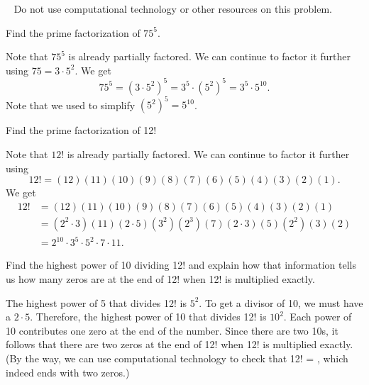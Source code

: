 \begin{exam}
\label{exam_prime_fact}
~
    Do not use computational technology or other resources on this problem.
        \begin{apart}
            \item Find the prime factorization of $75^5$.  
                \begin{soln}
                    Note that $75^5$ is already partially factored.  We can continue to factor it further using $75 = 3\cdot5^2$.  We get
                        $$75^5=(3\cdot5^2)^5
                        =3^5 \cdot \left(5^2\right)^5
                        = 3^5\cdot 5^{10}.$$
                    Note that we used  to simplify $\left(5^2\right)^5=5^{10}$.
                \end{soln}
            \item Find the prime factorization of 12! 
                \begin{soln}
                    Note that $12!$ is already partially factored.  We can continue to factor it further using $$12! = (12)(11)(10)(9)(8)(7)(6)(5)(4)(3)(2)(1).$$  We get
                        \begin{align*}
                            12! &= (12)(11)(10)(9)(8)(7)(6)(5)(4)(3)(2)(1) \\
                            &= (2^2 \cdot 3)(11)(2 \cdot 5)(3^2)(2^3)(7)(2\cdot 3)(5)(2^2)(3)(2)\\
                            &= 2^{10}\cdot 3^5 \cdot 5^2 \cdot 7 \cdot 11.
                        \end{align*}
                \end{soln}  
        \item Find the highest power of 10 dividing 12! and explain how that information tells us how many zeros are at the end of 12! when 12! is multiplied exactly. 
            \begin{soln}
                The highest power of 5 that divides 12! is $5^2$.  To get a divisor of 10, we must have a $2 \cdot 5$.  Therefore, the highest power of 10 that divides 12! is $10^2$.  Each power of 10 contributes one zero at the end of the number. Since there are two 10s, it follows that there are two zeros at the end of 12! when 12! is multiplied exactly. (By the way, we can use computational technology to check that 12! = , which indeed ends with two zeros.) 
            \end{soln}
        \end{apart}
\end{exam}

